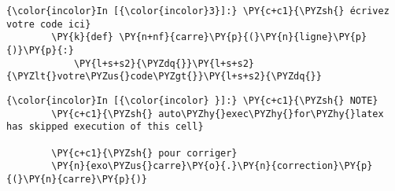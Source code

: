     \begin{Verbatim}[commandchars=\\\{\}]
{\color{incolor}In [{\color{incolor}3}]:} \PY{c+c1}{\PYZsh{} écrivez votre code ici}
        \PY{k}{def} \PY{n+nf}{carre}\PY{p}{(}\PY{n}{ligne}\PY{p}{)}\PY{p}{:}
            \PY{l+s+s2}{\PYZdq{}}\PY{l+s+s2}{\PYZlt{}votre\PYZus{}code\PYZgt{}}\PY{l+s+s2}{\PYZdq{}}
\end{Verbatim}


    \begin{Verbatim}[commandchars=\\\{\}]
{\color{incolor}In [{\color{incolor} }]:} \PY{c+c1}{\PYZsh{} NOTE}
        \PY{c+c1}{\PYZsh{} auto\PYZhy{}exec\PYZhy{}for\PYZhy{}latex has skipped execution of this cell}
        
        \PY{c+c1}{\PYZsh{} pour corriger}
        \PY{n}{exo\PYZus{}carre}\PY{o}{.}\PY{n}{correction}\PY{p}{(}\PY{n}{carre}\PY{p}{)}
\end{Verbatim}



    
    
    
